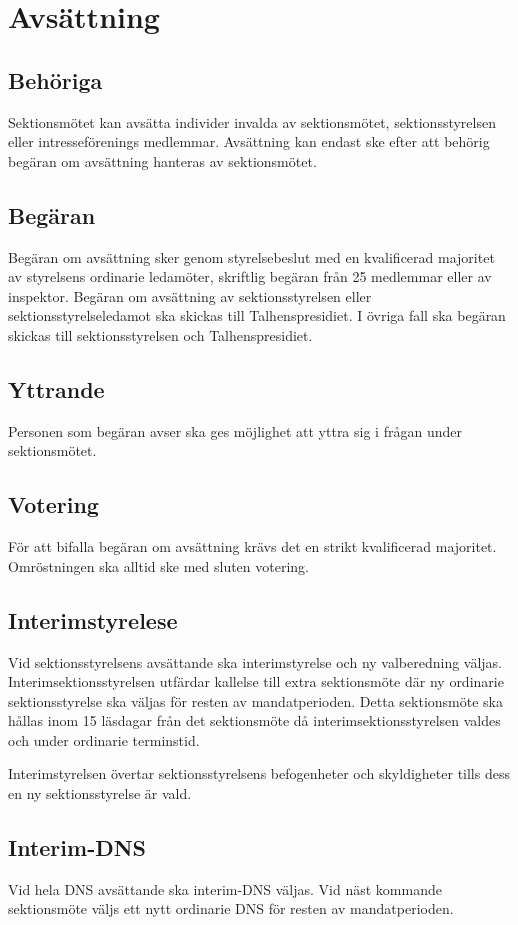 \section{Avsättning}
\subsection{Behöriga}
Sektionsmötet kan avsätta individer invalda av sektionsmötet, sektionsstyrelsen eller intresseförenings medlemmar.
Avsättning kan endast ske efter att behörig begäran om avsättning hanteras av sektionsmötet.
\subsection{Begäran}
Begäran om avsättning sker genom styrelsebeslut med en kvalificerad majoritet av styrelsens ordinarie ledamöter, skriftlig begäran från 25 medlemmar eller av inspektor.
Begäran om avsättning av sektionsstyrelsen eller sektionsstyrelseledamot ska skickas till Talhenspresidiet.
I övriga fall ska begäran skickas till sektionsstyrelsen och Talhenspresidiet.
\subsection{Yttrande}
Personen som begäran avser ska ges möjlighet att yttra sig i frågan under sektionsmötet.
\subsection{Votering}
För att bifalla begäran om avsättning krävs det en strikt kvalificerad majoritet.
Omröstningen ska alltid ske med sluten votering.
\subsection{Interimstyrelese}
Vid sektionsstyrelsens avsättande ska interimstyrelse och ny valberedning väljas.
Interimsektionsstyrelsen utfärdar kallelse till extra sektionsmöte där ny ordinarie sektionsstyrelse ska väljas för resten av mandatperioden.
Detta sektionsmöte ska hållas inom 15 läsdagar från det sektionsmöte då interimsektionsstyrelsen valdes och under ordinarie terminstid.

Interimstyrelsen övertar sektionsstyrelsens befogenheter och skyldigheter tills dess en ny sektionsstyrelse är vald.
\subsection{Interim-DNS}
Vid hela DNS avsättande ska interim-DNS väljas.
Vid näst kommande sektionsmöte väljs ett nytt ordinarie DNS för resten av mandatperioden.

